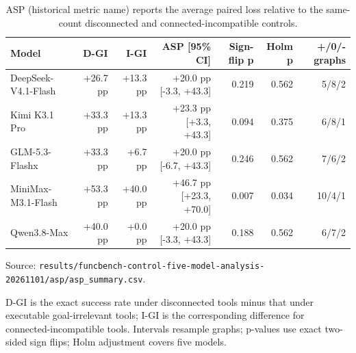 \begin{table}[htbp]
\centering
\caption{ASP (historical metric name) reports the average paired loss relative to the same-count disconnected and connected-incompatible controls.}
\label{tab:asp}
\footnotesize
\setlength{\tabcolsep}{3pt}
\renewcommand{\arraystretch}{1.08}
\begin{tabularx}{\textwidth}{>{\raggedright\arraybackslash}Xrrrrrr}
\toprule
Model & D-GI & I-GI & ASP [95\% CI] & Sign-flip p & Holm p & +/0/- graphs \\
\midrule
DeepSeek-V4.1-Flash & +26.7 pp & +13.3 pp & +20.0 pp [-3.3, +43.3] & 0.219 & 0.562 & 5/8/2 \\
Kimi K3.1 Pro & +33.3 pp & +13.3 pp & +23.3 pp [+3.3, +43.3] & 0.094 & 0.375 & 6/8/1 \\
GLM-5.3-Flashx & +33.3 pp & +6.7 pp & +20.0 pp [-6.7, +43.3] & 0.246 & 0.562 & 7/6/2 \\
MiniMax-M3.1-Flash & +53.3 pp & +40.0 pp & +46.7 pp [+23.3, +70.0] & 0.007 & 0.034 & 10/4/1 \\
Qwen3.8-Max & +40.0 pp & +0.0 pp & +20.0 pp [-3.3, +43.3] & 0.188 & 0.562 & 6/7/2 \\
\bottomrule
\end{tabularx}
\par\parbox{\linewidth}{\raggedright\footnotesize Source: \texttt{results/\allowbreak{}funcbench-control-five-model-analysis-20261101/\allowbreak{}asp/\allowbreak{}asp\_summary.csv}.}
\par\parbox{\linewidth}{\raggedright\footnotesize D-GI is the exact success rate under disconnected tools minus that under executable goal-irrelevant tools; I-GI is the corresponding difference for connected-incompatible tools. Intervals resample graphs; p-values use exact two-sided sign flips; Holm adjustment covers five models.}
\end{table}
